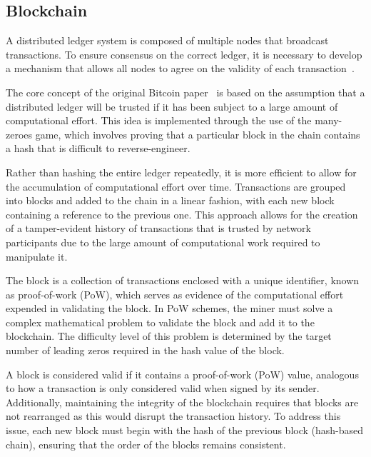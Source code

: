 \subsection{Blockchain}
A distributed ledger system is composed of multiple nodes that broadcast transactions. To ensure consensus on the correct ledger, it is necessary to develop a mechanism that allows all nodes to agree on the validity of each transaction~\cite{el2018review}.

The core concept of the original Bitcoin paper~\cite{nakamoto2008bitcoin} is based on the assumption that a distributed ledger will be trusted if it has been subject to a large amount of computational effort. This idea is implemented through the use of the many-zeroes game, which involves proving that a particular block in the chain contains a hash that is difficult to reverse-engineer.

Rather than hashing the entire ledger repeatedly, it is more efficient to allow for the accumulation of computational effort over time. Transactions are grouped into blocks and added to the chain in a linear fashion, with each new block containing a reference to the previous one. This approach allows for the creation of a tamper-evident history of transactions that is trusted by network participants due to the large amount of computational work required to manipulate it.

%

The block is a collection of transactions enclosed with a unique identifier, known as proof-of-work (PoW), which serves as evidence of the computational effort expended in validating the block. In PoW schemes, the miner must solve a complex mathematical problem to validate the block and add it to the blockchain. The difficulty level of this problem is determined by the target number of leading zeros required in the hash value of the block.

%

A block is considered valid if it contains a proof-of-work (PoW) value, analogous to how a transaction is only considered valid when signed by its sender. Additionally, maintaining the integrity of the blockchain requires that blocks are not rearranged as this would disrupt the transaction history. To address this issue, each new block must begin with the hash of the previous block (hash-based chain), ensuring that the order of the blocks remains consistent.




